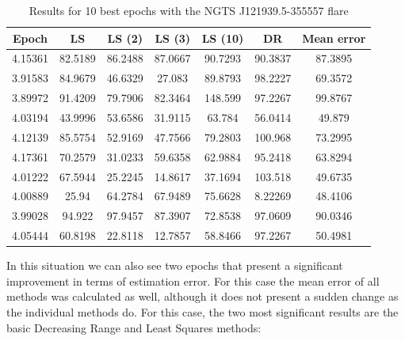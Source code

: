 \begin{table}[h!]
	\centering
	\def\arraystretch{1.2}
	\begin{tabular}{|c c c c c c c|} 
		\hline
		Epoch & LS & LS (2) & LS (3) & LS (10) & DR & Mean error \\ [0.5ex] 
		\hline\hline
		4.15361 & 82.5189 & 86.2488 & 87.0667 & 90.7293 & 90.3837 & 87.3895 \\
		\hline
		3.91583 & 84.9679 & 46.6329 & 27.083 & 89.8793 & 98.2227 & 69.3572 \\
		\hline
		3.89972 & 91.4209 & 79.7906 & 82.3464 & 148.599 & 97.2267 & 99.8767 \\
		\hline
		4.03194 & 43.9996 & 53.6586 & 31.9115 & 63.784 & 56.0414 & 49.879 \\
		\hline
		4.12139 & 85.5754 & 52.9169 & 47.7566 & 79.2803 & 100.968 & 73.2995 \\
		\hline
		4.17361 & 70.2579 & 31.0233 & 59.6358 & 62.9884 & 95.2418 & 63.8294 \\
		\hline
		4.01222 & 67.5944 & 25.2245 & 14.8617 & 37.1694 & 103.518 & 49.6735 \\
		\hline
		4.00889 & 25.94 & 64.2784 & 67.9489 & 75.6628 & 8.22269 & 48.4106 \\
		\hline
		3.99028 & 94.922 & 97.9457 & 87.3907 & 72.8538 & 97.0609 & 90.0346 \\
		\hline
		4.05444 & 60.8198 & 22.8118 & 12.7857 & 58.8466 & 97.2267 & 50.4981 \\
		\hline
	\end{tabular}
	\caption{Results for 10 best epochs with the NGTS J121939.5-355557 flare}
	\label{tab:UULATable}
\end{table}

In this situation we can also see two epochs that present a significant improvement in terms of estimation error. For this case the mean error of all methods was calculated as well, although it does not present a sudden change as the individual methods do. For this case, the two most significant results are the basic Decreasing Range and Least Squares methods:

